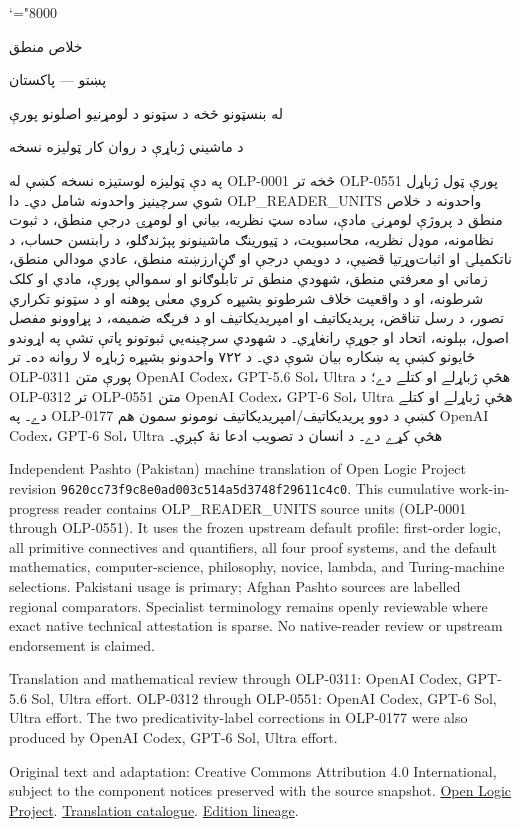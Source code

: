 \documentclass[11pt,a4paper,oneside]{report}
\theoremstyle{definition}
\begin{document}
\setRTL
\mathcode`\!="8000
\begin{titlepage}
\thispagestyle{empty}
\begin{center}
\vspace*{22mm}
{\Huge خلاص منطق}\par\bigskip
{\Large پښتو — پاکستان}\par\bigskip
{\LARGE له بنسټونو څخه د سټونو د لومړنيو اصلونو پورې}\par\bigskip
د ماشيني ژباړې د روان کار ټوليزه نسخه
\end{center}
\bigskip
په دې ټوليزه لوستيزه نسخه کښې له OLP-0001 څخه تر OLP-0551 پورې
ټول ژباړل شوي سرچينيز واحدونه شامل دي۔ دا OLP_READER_UNITS واحدونه د
خلاص منطق د پروژې لومړنۍ مادې، ساده سټ نظريه، بياني او لومړۍ درجې
منطق، د ثبوت نظامونه، موډل نظريه، محاسبويت، د ټيورينګ ماشينونو
پېژندګلو، د رابنسن حساب، د ناتکميلۍ او اثبات‌وړتيا قضيې، د دويمې درجې او
ګڼ‌ارزښته منطق، عادي مودالي منطق، زماني او معرفتي منطق، شهودي منطق
تر تابلوګانو او سموالې پورې، مادي او کلک شرطونه، او د واقعيت خلاف
شرطونو بشپړه کروي معنٰی پوهنه او د سټونو تکراري تصور،
د رسل تناقض، پريديکاتيف او امپريديکاتيف او د فرېګه ضميمه، د پړاوونو مفصل اصول، بېلونه، اتحاد او جوړې رانغاړي۔ د شهودي سرچينه‌يي ثبوتونو پاتې
تشې په اړوندو ځايونو کښې په ښکاره بيان شوې دي۔
د ۷۲۲ واحدونو بشپړه ژباړه لا روانه ده۔ تر OLP-0311 پورې متن
OpenAI Codex، GPT-5.6 Sol، Ultra هڅې ژباړلے او کتلے دے؛
د OLP-0312 تر OLP-0551 متن OpenAI Codex، GPT-6 Sol، Ultra
هڅې ژباړلے او کتلے دے۔ په OLP-0177 کښې د دوو پريديکاتيف/امپريديکاتيف
نومونو سمون هم OpenAI Codex، GPT-6 Sol، Ultra هڅې کړے دے۔
د انسان د تصويب ادعا نۀ کېږي۔

\begin{LTR}\latinfont\small
Independent Pashto (Pakistan) machine translation of Open Logic Project
revision \texttt{9620cc73f9c8e0ad003c514a5d3748f29611c4c0}. This cumulative
work-in-progress reader contains OLP_READER_UNITS source units (OLP-0001
through OLP-0551). It uses the frozen upstream default profile: first-order
logic, all primitive connectives and quantifiers, all four proof systems,
and the default mathematics, computer-science, philosophy, novice, lambda,
and Turing-machine selections. Pakistani usage is primary; Afghan Pashto
sources are labelled regional comparators. Specialist terminology remains
openly reviewable where exact native technical attestation is sparse. No
native-reader review or upstream endorsement is claimed.

Translation and mathematical review through OLP-0311: OpenAI Codex,
GPT-5.6 Sol, Ultra effort. OLP-0312 through OLP-0551: OpenAI Codex,
GPT-6 Sol, Ultra effort. The two predicativity-label corrections in
OLP-0177 were also produced by OpenAI Codex, GPT-6 Sol, Ultra effort.

Original text and adaptation: Creative Commons Attribution 4.0 International,
subject to the component notices preserved with the source snapshot.
\href{https://openlogicproject.org/}{Open Logic Project}.\quad
\href{https://github.com/KokunoYumeto/OpenLogic-translations}{Translation catalogue}.\quad
\href{https://doi.org/10.5281/zenodo.22307197}{Edition lineage}.
\end{LTR}
\end{titlepage}
\tableofcontents
\clearpage
\end{document}
